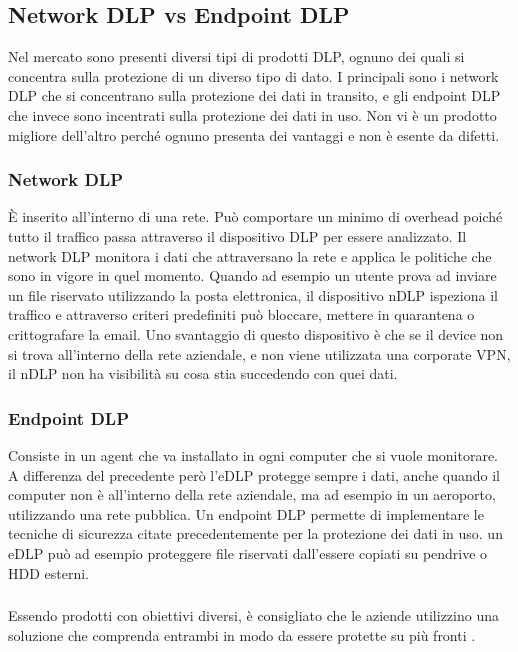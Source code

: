 \subsection{Network DLP vs Endpoint DLP}
    Nel mercato sono presenti diversi tipi di prodotti DLP, ognuno dei quali si concentra sulla protezione
    di un diverso tipo di dato. I principali sono i network DLP che si concentrano sulla protezione dei dati
    in transito, e gli endpoint DLP che invece sono incentrati sulla protezione dei dati in uso.
    Non vi è un prodotto migliore dell'altro perché ognuno presenta dei vantaggi e non è esente da difetti.

    \subsubsection{Network DLP}
            È inserito all'interno di una rete. Può comportare un minimo di overhead poiché tutto il traffico
            passa attraverso il dispositivo DLP per essere analizzato.
            Il network DLP monitora i dati che attraversano la rete e applica le politiche che sono in vigore
            in quel momento. Quando ad esempio un utente prova ad inviare un file riservato utilizzando la posta
            elettronica, il  dispositivo nDLP ispeziona il traffico e attraverso criteri predefiniti 
            può bloccare, mettere in quarantena o crittografare la email.
            Uno svantaggio di questo dispositivo è che se il device non si trova all'interno della rete aziendale,
            e non viene utilizzata una corporate VPN, il nDLP non ha visibilità su cosa stia succedendo con quei 
            dati.

    \subsubsection{Endpoint DLP}
            Consiste in un agent che va installato in ogni computer che si vuole monitorare. A differenza del precedente 
            però l'eDLP protegge sempre i dati, anche quando il computer non è all'interno della rete aziendale, ma ad esempio in un 
            aeroporto, utilizzando una rete pubblica. Un endpoint DLP permette di implementare le tecniche di sicurezza
            citate precedentemente per la protezione dei dati in uso. un eDLP può ad esempio proteggere file riservati
            dall'essere copiati su pendrive o HDD esterni.
    
    \subsubsection*{}     
    Essendo prodotti con obiettivi diversi, è consigliato che le aziende utilizzino una soluzione che comprenda entrambi
    in modo da essere protette su più fronti \cite{DLP5}.


